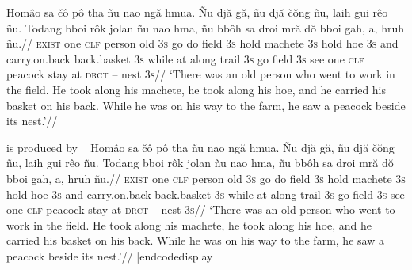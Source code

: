 \framedisplay
\ex[glhangstyle=cascade]
\let\\=\textsc
\begingl
\gla
Hom\^{a}o sa \v{c}\^{o} p\^{o} tha  \~{n}u nao ng\u{a} hmua. \~{N}u
dj\u{a} g\u{a}, \~{n}u dj\u{a} \v{c}\u{o}ng \~{n}u, laih gui r\^{e}o
\~{n}u. Todang bboi r\^{o}k jolan \~{n}u nao hma, \~{n}u bb\^{o}h sa
droi mr\u{a} d\u{o} bboi gah, a, hruh \~{n}u.//
\glb
\\{exist} one \\{clf} person old \\{3s} go do field \\{3s} hold
machete \\{3s} hold hoe \\{3s} and carry.on.back back.basket \\{3s}
while at along trail \\{3s} go field \\{3s} see one \\{clf} peacock
stay at \\{drct} -- nest \\{3s}//
\glft
`There was an old person who went to work in the field. He took
along his machete, he took along his hoe, and he carried his
basket on his back. While he was on his way to the farm, he saw a
peacock beside its nest.'//
\endgl
\xe
\endframedisplay

is produced by
\codedisplay~
\ex[glhangstyle=cascade]
\let\\=\textsc
\begingl
\gla
Hom\^{a}o sa \v{c}\^{o} p\^{o} tha  \~{n}u nao ng\u{a} hmua. \~{N}u
dj\u{a} g\u{a}, \~{n}u dj\u{a} \v{c}\u{o}ng \~{n}u, laih gui r\^{e}o
\~{n}u. Todang bboi r\^{o}k jolan \~{n}u nao hma, \~{n}u bb\^{o}h sa
droi mr\u{a} d\u{o} bboi gah, a, hruh \~{n}u.//
\glb
\\{exist} one \\{clf} person old \\{3s} go do field \\{3s} hold
machete \\{3s} hold hoe \\{3s} and carry.on.back back.basket \\{3s}
while at along trail \\{3s} go field \\{3s} see one \\{clf} peacock
stay at \\{drct} -- nest \\{3s}//
\glft
`There was an old person who went to work in the field. He took
along his machete, he took along his hoe, and he carried his
basket on his back. While he was on his way to the farm, he saw a
peacock beside its nest.'//
\endgl
\xe
|endcodedisplay

